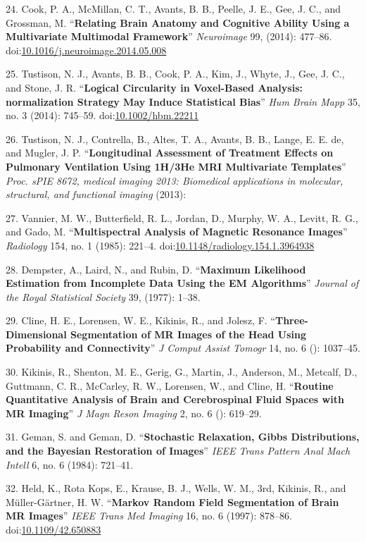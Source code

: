 \documentclass[11pt,]{article}
\begin{document}
24. Cook, P. A., McMillan, C. T., Avants, B. B., Peelle, J. E., Gee, J.
C., and Grossman, M. ``\textbf{Relating Brain Anatomy and Cognitive
Ability Using a Multivariate Multimodal Framework}'' \emph{Neuroimage}
99, (2014): 477--86.
doi:\href{http://dx.doi.org/10.1016/j.neuroimage.2014.05.008}{10.1016/j.neuroimage.2014.05.008}

25. Tustison, N. J., Avants, B. B., Cook, P. A., Kim, J., Whyte, J.,
Gee, J. C., and Stone, J. R. ``\textbf{Logical Circularity in
Voxel-Based Analysis: normalization Strategy May Induce Statistical
Bias}'' \emph{Hum Brain Mapp} 35, no. 3 (2014): 745--59.
doi:\href{http://dx.doi.org/10.1002/hbm.22211}{10.1002/hbm.22211}

26. Tustison, N. J., Contrella, B., Altes, T. A., Avants, B. B., Lange,
E. E. de, and Mugler, J. P. ``\textbf{Longitudinal Assessment of
Treatment Effects on Pulmonary Ventilation Using 1H/3He MRI Multivariate
Templates}'' \emph{Proc. sPIE 8672, medical imaging 2013: Biomedical
applications in molecular, structural, and functional imaging} (2013):

27. Vannier, M. W., Butterfield, R. L., Jordan, D., Murphy, W. A.,
Levitt, R. G., and Gado, M. ``\textbf{Multispectral Analysis of Magnetic
Resonance Images}'' \emph{Radiology} 154, no. 1 (1985): 221--4.
doi:\href{http://dx.doi.org/10.1148/radiology.154.1.3964938}{10.1148/radiology.154.1.3964938}

28. Dempster, A., Laird, N., and Rubin, D. ``\textbf{Maximum Likelihood
Estimation from Incomplete Data Using the EM Algorithms}'' \emph{Journal
of the Royal Statistical Society} 39, (1977): 1--38.

29. Cline, H. E., Lorensen, W. E., Kikinis, R., and Jolesz, F.
``\textbf{Three-Dimensional Segmentation of MR Images of the Head Using
Probability and Connectivity}'' \emph{J Comput Assist Tomogr} 14, no. 6
(): 1037--45.

30. Kikinis, R., Shenton, M. E., Gerig, G., Martin, J., Anderson, M.,
Metcalf, D., Guttmann, C. R., McCarley, R. W., Lorensen, W., and Cline,
H. ``\textbf{Routine Quantitative Analysis of Brain and Cerebrospinal
Fluid Spaces with MR Imaging}'' \emph{J Magn Reson Imaging} 2, no. 6 ():
619--29.

31. Geman, S. and Geman, D. ``\textbf{Stochastic Relaxation, Gibbs
Distributions, and the Bayesian Restoration of Images}'' \emph{IEEE
Trans Pattern Anal Mach Intell} 6, no. 6 (1984): 721--41.

32. Held, K., Rota Kops, E., Krause, B. J., Wells, W. M., 3rd, Kikinis,
R., and M{ü}ller-G{ä}rtner, H. W. ``\textbf{Markov Random Field
Segmentation of Brain MR Images}'' \emph{IEEE Trans Med Imaging} 16, no.
6 (1997): 878--86.
doi:\href{http://dx.doi.org/10.1109/42.650883}{10.1109/42.650883}
\end{document}
